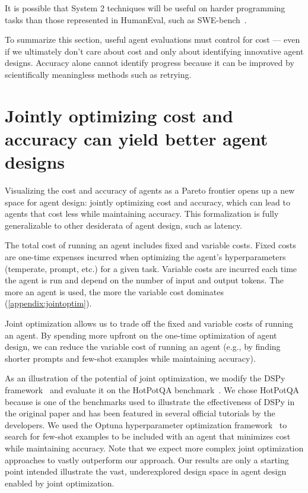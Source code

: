 \documentclass{article}
\begin{document}
It is possible that System 2 techniques will be useful on harder programming tasks than those represented in HumanEval, such as SWE-bench~\citep{jimenez_swe-bench_2023}. 

To summarize this section, useful agent evaluations must control for cost — even if we ultimately don't care about cost and only about identifying innovative agent designs. Accuracy alone cannot identify progress because it can be improved by scientifically meaningless methods such as retrying.



\section{Jointly optimizing cost and accuracy can yield better agent designs}\label{sec:joint-optimization}

Visualizing the cost and accuracy of agents as a Pareto frontier opens up a new space for agent design: jointly optimizing cost and accuracy, which can lead to agents that cost less while maintaining accuracy. This formalization is fully generalizable to other desiderata of agent design, such as latency.

The total cost of running an agent includes fixed and variable costs. Fixed costs are one-time expenses incurred when optimizing the agent's hyperparameters (temperate, prompt, etc.) for a given task. Variable costs are incurred each time the agent is run and depend on the number of input and output tokens. The more an agent is used, the more the variable cost dominates (\cref{appendix:jointoptim}). 

Joint optimization allows us to trade off the fixed and variable costs of running an agent. By spending more upfront on the one-time optimization of agent design, we can reduce the variable cost of running an agent (e.g., by finding shorter prompts and few-shot examples while maintaining accuracy).

As an illustration of the potential of joint optimization, we modify the DSPy framework~\citep{khattab_dspy_2023} and evaluate it on the HotPotQA benchmark~\citep{yang_hotpotqa_2018}.
We chose HotPotQA because is one of the benchmarks used to illustrate the effectiveness of DSPy in the original paper and has been featured in several official tutorials by the developers.
We used the Optuna hyperparameter optimization framework~\citep{akiba_optuna_2019} to search for few-shot examples to be included with an agent that minimizes cost while maintaining accuracy. Note that we expect more complex joint optimization approaches to vastly outperform our approach. Our results are only a starting point intended illustrate the vast, underexplored design space in agent design enabled by joint optimization. 
\end{document}
